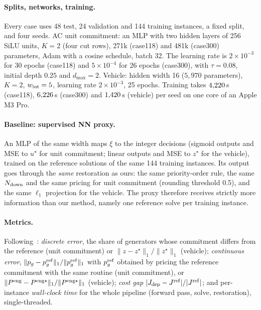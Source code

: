 \documentclass[10pt]{article}
\begin{document}
\paragraph{Splits, networks, training.} Every case uses 48 test, 24 validation and 144 training instances, a fixed split, and four seeds. AC unit commitment: an MLP with two hidden layers of 256 SiLU units, $K=2$ (four cut rows), 271k (case118) and 481k (case300) parameters, Adam with a cosine schedule, batch 32. The learning rate is $2\times10^{-3}$ for 30 epochs (case118) and $5\times10^{-4}$ for 26 epochs (case300), with $\tau=0.08$, initial depth $0.25$ and $d_{\max}=2$. Vehicle: hidden width 16 ($5{,}970$ parameters), $K=2$, $w_{\rm int}=5$, learning rate $2\times10^{-3}$, 25 epochs. Training takes $4{,}220$\,s (case118), $6{,}226$\,s (case300) and $1{,}420$\,s (vehicle) per seed on one core of an Apple M3 Pro.

\paragraph{Baseline: supervised NN proxy.} An MLP of the same width maps $\xi$ to the integer decisions (sigmoid outputs and MSE to $u^\star$ for unit commitment; linear outputs and MSE to $z^\star$ for the vehicle), trained on the reference solutions of the same 144 training instances. Its output goes through the \emph{same} restoration as ours: the same priority-order rule, the same $N_{\rm down}$ and the same pricing for unit commitment (rounding threshold 0.5), and the same $\ell_1$ projection for the vehicle. The proxy therefore receives strictly more information than our method, namely one reference solve per training instance.

\paragraph{Metrics.} Following~\citep{dixit2025dfsm}: \emph{discrete error}, the share of generators whose commitment differs from the reference (unit commitment) or $\|z-z^\star\|_1/\|z^\star\|_1$ (vehicle); \emph{continuous error}, $\|p_g-p_g^{\rm ref}\|_1/\|p_g^{\rm ref}\|_1$ with $p_g^{\rm ref}$ obtained by pricing the reference commitment with the same routine (unit commitment), or $\|P^{\rm eng}-P^{\rm eng\star}\|_1/\|P^{\rm eng\star}\|_1$ (vehicle); \emph{cost gap} $|J_{\rm dep}-J^{\rm ref}|/|J^{\rm ref}|$; and per-instance \emph{wall-clock time} for the whole pipeline (forward pass, solve, restoration), single-threaded.
\end{document}
